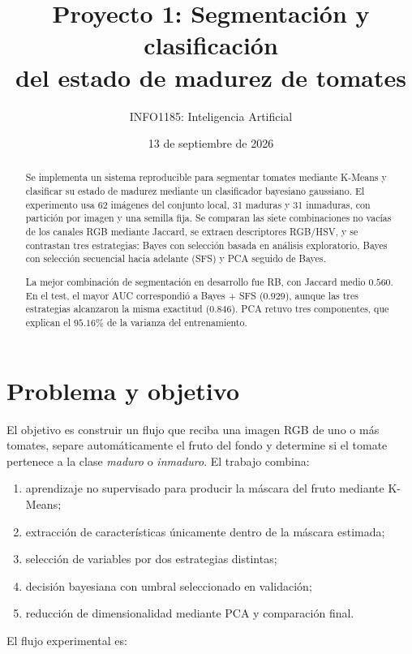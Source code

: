 \documentclass[11pt,a4paper]{article}
\title{\textbf{Proyecto 1: Segmentación y clasificación\\del estado de madurez de tomates}}
\author{INFO1185: Inteligencia Artificial}
\date{13 de septiembre de 2026}
\begin{document}
\maketitle

\begin{abstract}
Se implementa un sistema reproducible para segmentar tomates mediante K-Means y
clasificar su estado de madurez mediante un clasificador bayesiano gaussiano. El
experimento usa 62 imágenes del conjunto local, 31 maduras y 31 inmaduras, con
partición por imagen y una semilla fija. Se comparan las siete combinaciones no
vacías de los canales RGB mediante Jaccard, se extraen descriptores RGB/HSV, y se
contrastan tres estrategias: Bayes con selección basada en análisis exploratorio,
Bayes con selección secuencial hacia adelante (SFS) y PCA seguido de Bayes.

La mejor combinación de segmentación en desarrollo fue RB, con Jaccard medio
$0.560$. En el test, el mayor AUC correspondió a Bayes + SFS ($0.929$), aunque las
tres estrategias alcanzaron la misma exactitud ($0.846$). PCA retuvo tres
componentes, que explican el $95.16\%$ de la varianza del entrenamiento.
\end{abstract}

\tableofcontents
\newpage

\section{Problema y objetivo}

El objetivo es construir un flujo que reciba una imagen RGB de uno o más tomates,
separe automáticamente el fruto del fondo y determine si el tomate pertenece a la
clase \emph{maduro} o \emph{inmaduro}. El trabajo combina:

\begin{enumerate}[leftmargin=1.5em]
    \item aprendizaje no supervisado para producir la máscara del fruto mediante
    K-Means;
    \item extracción de características únicamente dentro de la máscara estimada;
    \item selección de variables por dos estrategias distintas;
    \item decisión bayesiana con umbral seleccionado en validación;
    \item reducción de dimensionalidad mediante PCA y comparación final.
\end{enumerate}

El flujo experimental es:
\end{document}
